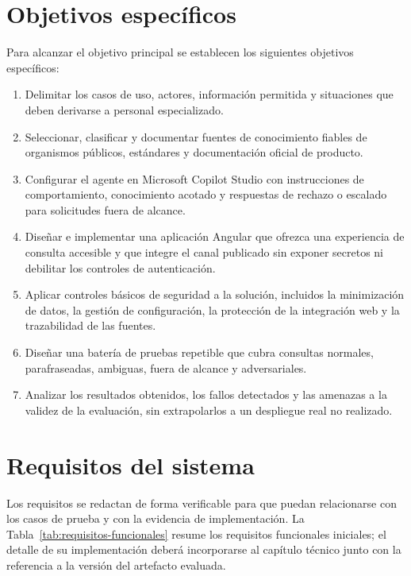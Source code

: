\documentclass[12pt,twoside,titlepage]{book}
\begin{document}
\section{Objetivos específicos}
\label{sec:objetivos-especificos}

Para alcanzar el objetivo principal se establecen los siguientes objetivos
específicos:

\begin{enumerate}
  \item Delimitar los casos de uso, actores, información permitida y situaciones
  que deben derivarse a personal especializado.
  \item Seleccionar, clasificar y documentar fuentes de conocimiento fiables de
  organismos públicos, estándares y documentación oficial de producto.
  \item Configurar el agente en Microsoft Copilot Studio con instrucciones de
  comportamiento, conocimiento acotado y respuestas de rechazo o escalado para
  solicitudes fuera de alcance.
  \item Diseñar e implementar una aplicación Angular que ofrezca una experiencia
  de consulta accesible y que integre el canal publicado sin exponer secretos ni
  debilitar los controles de autenticación.
  \item Aplicar controles básicos de seguridad a la solución, incluidos la
  minimización de datos, la gestión de configuración, la protección de la
  integración web y la trazabilidad de las fuentes.
  \item Diseñar una batería de pruebas repetible que cubra consultas normales,
  parafraseadas, ambiguas, fuera de alcance y adversariales.
  \item Analizar los resultados obtenidos, los fallos detectados y las amenazas a
  la validez de la evaluación, sin extrapolarlos a un despliegue real no
  realizado.
\end{enumerate}

\section{Requisitos del sistema}
\label{sec:requisitos}

Los requisitos se redactan de forma verificable para que puedan relacionarse con
los casos de prueba y con la evidencia de implementación. La
Tabla~\ref{tab:requisitos-funcionales} resume los requisitos funcionales
iniciales; el detalle de su implementación deberá incorporarse al capítulo
técnico junto con la referencia a la versión del artefacto evaluada.
\end{document}

